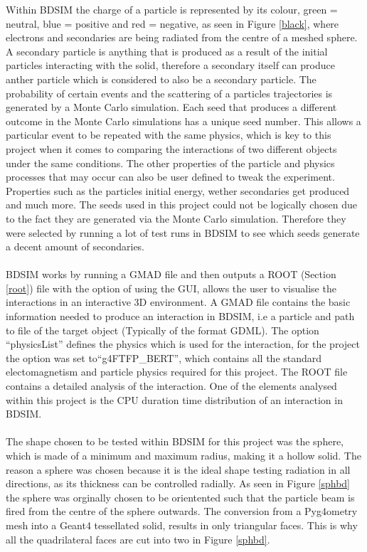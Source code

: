 \documentclass[12pt,a4paper]{article}
\begin{document}
\noindent Within BDSIM the charge of a particle is represented by its colour, green = neutral, blue = positive and red = negative, as seen in Figure \ref{black}, where electrons and secondaries are being radiated from the centre of a meshed sphere. A secondary particle is anything that is produced as a result of the initial particles interacting with the solid, therefore a secondary itself can produce anther particle which is considered to also be  a secondary particle. The probability of certain events and the scattering of a particles trajectories is generated by a Monte Carlo simulation. Each seed that produces a different outcome in the Monte Carlo simulations has a unique seed number. This allows a particular event to be repeated with the same physics, which is key to this project when it comes to comparing the interactions of two different objects under the same conditions. The other properties of the particle and physics processes that may occur can also be user defined to tweak the experiment. Properties such as the particles initial energy, wether secondaries get produced and much more. The seeds used in this project could not be logically chosen due to the fact they are generated via the Monte Carlo simulation. Therefore they were selected by running a lot of test runs in BDSIM to see which seeds generate a decent amount of secondaries.
\\\\
BDSIM works by running a GMAD file and then outputs  a ROOT (Section \ref{root}) file with the option of using the GUI, allows the user to visualise the interactions in an interactive 3D environment. A GMAD file contains the basic information needed to produce an interaction in BDSIM, i.e a particle and path to file of the target object (Typically of the format GDML). The option ``physicsList'' defines the physics which is used for the interaction, for the project the option was set to``g4FTFP\_BERT'', which contains all the standard electomagnetism and particle physics required for this project. The ROOT file contains a detailed analysis of the interaction. One of the elements analysed within this project is the CPU duration time distribution of an interaction in BDSIM.
\\\\
The shape chosen to be tested within BDSIM for this project was the sphere, which is made of a minimum and maximum radius, making it a hollow solid. The reason a sphere was chosen because it is the ideal shape testing radiation in all directions, as its thickness can be controlled radially. As seen in Figure \ref{sphbd} the sphere was orginally chosen to be orientented such that the particle beam is fired from the centre of the sphere outwards. The conversion from a Pyg4ometry mesh into a Geant4 tessellated solid, results in only triangular faces. This is why all the quadrilateral faces are cut into two in Figure \ref{sphbd}.
\end{document}
